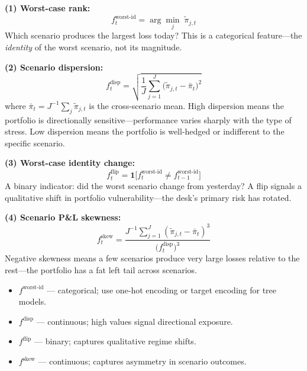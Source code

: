 \begin{definition}
\textbf{(1) Worst-case rank:}
\begin{equation}
\label{eq:worst-rank}
f^{\text{worst-id}}_t = \arg\min_j \;\tilde{\pi}_{j,t}
\end{equation}
Which scenario produces the largest loss today?  This is a categorical
feature---the \emph{identity} of the worst scenario, not its magnitude.

\textbf{(2) Scenario dispersion:}
\begin{equation}
\label{eq:scenario-disp}
f^{\text{disp}}_t = \sqrt{\frac{1}{J}\sum_{j=1}^{J}
  \bigl(\tilde{\pi}_{j,t} - \bar{\pi}_t\bigr)^2}
\end{equation}
where $\bar{\pi}_t = J^{-1}\sum_j \tilde{\pi}_{j,t}$ is the
cross-scenario mean.  High dispersion means the portfolio is
directionally sensitive---performance varies sharply with the type of
stress.  Low dispersion means the portfolio is well-hedged or
indifferent to the specific scenario.

\textbf{(3) Worst-case identity change:}
\begin{equation}
\label{eq:worst-flip}
f^{\text{flip}}_t = \mathbf{1}\!\bigl[
  f^{\text{worst-id}}_t \ne f^{\text{worst-id}}_{t-1}\bigr]
\end{equation}
A binary indicator: did the worst scenario change from yesterday?
A flip signals a qualitative shift in portfolio vulnerability---the
desk's primary risk has rotated.

\textbf{(4) Scenario P\&L skewness:}
\begin{equation}
\label{eq:scenario-skew}
f^{\text{skew}}_t = \frac{J^{-1}\sum_{j=1}^{J}
  (\tilde{\pi}_{j,t} - \bar{\pi}_t)^3}
  {\bigl(f^{\text{disp}}_t\bigr)^3}
\end{equation}
Negative skewness means a few scenarios produce very large losses
relative to the rest---the portfolio has a fat left tail across
scenarios.

\begin{itemize}[nosep]
  \item $f^{\text{worst-id}}$ --- categorical; use one-hot encoding or
        target encoding for tree models.
  \item $f^{\text{disp}}$ --- continuous; high values signal directional
        exposure.
  \item $f^{\text{flip}}$ --- binary; captures qualitative regime shifts.
  \item $f^{\text{skew}}$ --- continuous; captures asymmetry in
        scenario outcomes.
\end{itemize}
\end{definition}


